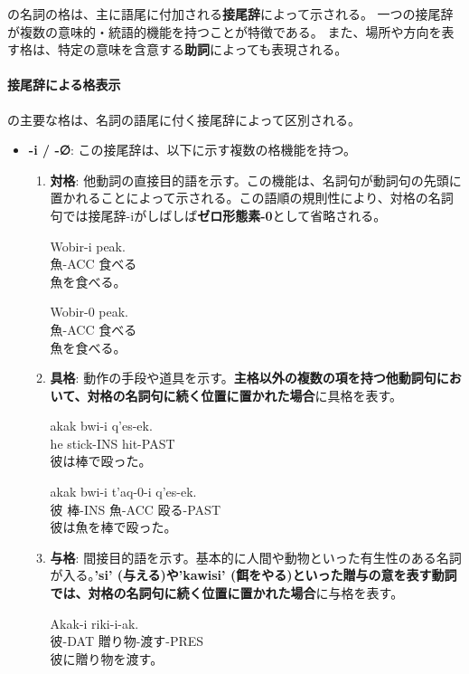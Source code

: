 \langname の名詞の格は、主に語尾に付加される\textbf{接尾辞}によって示される。
一つの接尾辞が複数の意味的・統語的機能を持つことが特徴である。
また、場所や方向を表す格は、特定の意味を含意する\textbf{助詞}によっても表現される。

\paragraph{接尾辞による格表示}

\langname の主要な格は、名詞の語尾に付く接尾辞によって区別される。

\begin{itemize}
    \item \textbf{-i / -∅}: この接尾辞は、以下に示す複数の格機能を持つ。
    \begin{enumerate}
    \item \textbf{対格}: 他動詞の直接目的語を示す。この機能は、名詞句が動詞句の先頭に置かれることによって示される。この語順の規則性により、対格の名詞句では接尾辞-iがしばしば\textbf{ゼロ形態素-0}として省略される。
    \begin{exe}
        \ex \gll Wobir-i peak. \\
        魚-ACC 食べる \\
        \glt 魚を食べる。
    \end{exe}
    \begin{exe}
        \ex \gll Wobir-0 peak. \\
        魚-ACC 食べる \\
        \glt 魚を食べる。
    \end{exe}

    \item \textbf{具格}: 動作の手段や道具を示す。\textbf{主格以外の複数の項を持つ他動詞句において、対格の名詞句に続く位置に置かれた場合}に具格を表す。
    \begin{exe}
        \ex \gll akak bwi-i q'es-ek. \\
        he stick-INS hit-PAST \\
        \glt 彼は棒で殴った。
    \end{exe}

    \begin{exe}
        \ex \gll akak bwi-i t'aq-0-i q'es-ek. \\
    彼 棒-INS 魚-ACC 殴る-PAST \\
        \glt 彼は魚を棒で殴った。
    \end{exe}

    \item \textbf{与格}: 間接目的語を示す。基本的に人間や動物といった有生性のある名詞が入る。\textbf{'si' (与える)や'kawisi' (餌をやる)といった贈与の意を表す動詞では、対格の名詞句に続く位置に置かれた場合}に与格を表す。
    \begin{exe}
        \ex \gll Akak-i riki-i-ak. \\
    彼-DAT 贈り物-渡す-PRES \\
        \glt 彼に贈り物を渡す。
    \end{exe}


\end{enumerate}
\end{itemize}
